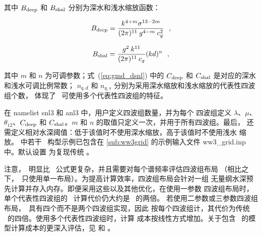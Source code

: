 \noindent
其中 $B_{\rm{deep}}$ 和 $B_{\rm{shal}}$ 分别为深水和浅水缩放函数：

\begin{equation}
B_{\rm{deep}} = \frac{k^{4+m} \sigma^{13-2m} }{(2\pi)^{11} \:
                 g^{4-m} \: c_g^2 } \:\:\: , \label{eq:gmd_B_deep}
\end{equation}

\begin{equation}
B_{\rm{shal}} = \frac{g^2 \: k^{11}}{(2\pi)^{11} \: c_g} (kd)^n
\:\:\: , \label{eq:gmd_B_shal}
\end{equation}

\noindent
其中 $m$ 和 $n$ 为可调参数；式~(\ref{eq:gmd_dsnl}) 中的
$C_{\rm{deep}}$ 和 $C_{\rm{shal}}$ 是对应的深水和浅水可调比例常数；
$n_{q,d}$ 和 $n_{q,s}$ 分别为采用深水缩放和浅水缩放的代表性四波组个数，
体现了 \gmd\ 可使用多个代表性四波组的特征。

在 namelist {\F snl3} 和 {\F anl3} 中，用户定义四波组数量，并为每个
四波组定义 $\lambda$、$\mu$、$\theta_{12}$、$C_{\rm{deep}}$ 和
$C_{\rm{shal}}$。$m$ 和 $n$ 的取值只定义一次，并用于所有四波组。最后，
还需定义相对水深阈值：低于该值时不使用深水缩放，高于该值时不使用浅水
缩放。\cite{tol:MMAB10d} 中若干 \gmd\ 构型示例已包含在
\para\ref{sub:ww3grid} 的示例输入文件 {\file ww3\_grid.inp} 中。默认设置
为复现传统 \dia。

注意，\gmd\ 明显比 \dia\ 公式更复杂，并且需要对每个谱频率评估四波组布局
（相比之下，\dia\ 只使用单一布局）。为提高计算效率，四波组布局会针对一组
无量纲水深预先计算并存入内存。即便采用这些以及其他优化，在使用一参数
四波组布局时，单个代表性四波组的 \gmd\ 计算代价仍大约是 \dia\ 的两倍。
若使用二参数或三参数四波组布局，\gmd\ 具有四个而不是两个四波组实现，因此
按每个四波组计，其代价为传统 \dia\ 的四倍。使用多个代表性四波组时，计算
成本按线性方式增加。关于包含 \gmd\ 的模型计算成本的更深入评估，见
\cite{tol:MMAB10d} 和 \cite{tol:OMOD13d}。
